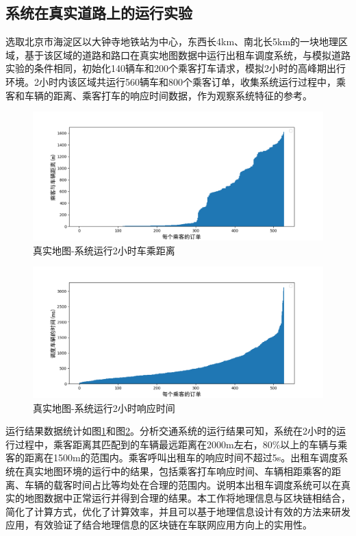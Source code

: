 \subsection{系统在真实道路上的运行实验}
选取北京市海淀区以大钟寺地铁站为中心，东西长4km、南北长5km的一块地理区域，基于该区域的道路和路口在真实地图数据中运行出租车调度系统，与模拟道路实验的条件相同，初始化140辆车和200个乘客打车请求，模拟2小时的高峰期出行环境。2小时内该区域共运行560辆车和800个乘客订单，收集系统运行过程中，乘客和车辆的距离、乘客打车的响应时间数据，作为观察系统特征的参考。

\begin{figure}[h]
  \centering
  \includegraphics[width=1.0\textwidth]{figures/real_2hDistance}
  \caption{真实地图-系统运行2小时车乘距离}\label{fig:real_2hDistance}
\end{figure}

\begin{figure}[h]
  \centering
  \includegraphics[width=1.0\textwidth]{figures/real_2hTime}
  \caption{真实地图-系统运行2小时响应时间}\label{fig:real_2hTime}
\end{figure}

运行结果数据统计如图\ref{fig:real_2hDistance}和图\ref{fig:real_2hTime}。分析交通系统的运行结果可知，系统在2小时的运行过程中，乘客距离其匹配到的车辆最远距离在2000m左右，80$\%$以上的车辆与乘客的距离在1500m的范围内。乘客呼叫出租车的响应时间不超过5s。出租车调度系统在真实地图环境的运行中的结果，包括乘客打车响应时间、车辆相距乘客的距离、车辆的载客时间占比等均处在合理的范围内。说明本出租车调度系统可以在真实的地图数据中正常运行并得到合理的结果。本工作将地理信息与区块链相结合，简化了计算方式，优化了计算效率，并且可以基于地理信息设计有效的方法来研发应用，有效验证了结合地理信息的区块链在车联网应用方向上的实用性。

